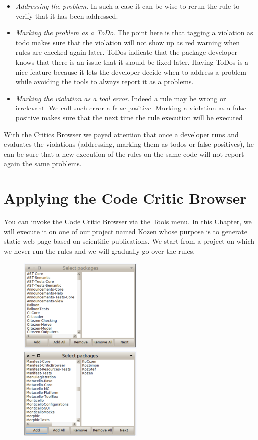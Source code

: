 \documentclass[a4paper,10pt,twoside]{book}
\begin{document}
\begin{itemize}
\item \emph{Addressing the problem}. In such a case it can be wise to rerun the rule to verify that it has been addressed.

\item \emph{Marking the problem as a ToDo}. The point here is that tagging a violation as todo makes sure that the violation will not show up as red warning when rules are checked again later. ToDos indicate that the package developer knows that there is an issue that it should be fixed later. Having ToDos is a nice feature because it lets the developer decide when to address a problem while avoiding the tools to always report it as a problems. 

\item \emph{Marking the violation as a tool error}. Indeed a rule may be wrong or irrelevant. We call such error a false positive. Marking a violation as a false positive makes sure that the next time the rule execution will be executed
\end{itemize}

With the Critics Browser we payed attention that once a developer runs and evaluates the violations (\ie addressing, marking them as todos or false positives), he can be sure that a new execution of the rules on the same code will not report again the same problems. 



\section{Applying the Code Critic Browser}

You can invoke the Code Critic Browser via the Tools menu. In this Chapter, we will execute it on one of our project named Kozen whose purpose is to generate static web page based on scientific publications. We start from a project on which we never run the rules and we will gradually go over the rules.
\begin{figure}[h]
\centering
\includegraphics[width=6cm]{selectingPackage}\includegraphics[width=6cm]{selectingPackage2} 
\end{figure}
\end{document}
